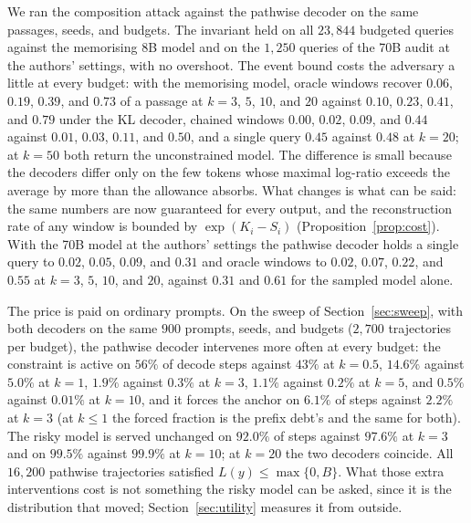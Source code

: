 We ran the composition attack against the pathwise decoder on the same passages, seeds, and budgets. The invariant held on all $23{,}844$ budgeted queries against the memorising 8B model and on the $1{,}250$ queries of the 70B audit at the authors' settings, with no overshoot. The event bound costs the adversary a little at every budget: with the memorising model, oracle windows recover $0.06$, $0.19$, $0.39$, and $0.73$ of a passage at $k = 3$, $5$, $10$, and $20$ against $0.10$, $0.23$, $0.41$, and $0.79$ under the KL decoder, chained windows $0.00$, $0.02$, $0.09$, and $0.44$ against $0.01$, $0.03$, $0.11$, and $0.50$, and a single query $0.45$ against $0.48$ at $k=20$; at $k=50$ both return the unconstrained model. The difference is small because the decoders differ only on the few tokens whose maximal log-ratio exceeds the average by more than the allowance absorbs. What changes is what can be said: the same numbers are now guaranteed for every output, and the reconstruction rate of any window is bounded by $\exp(K_i - S_i)$ (Proposition~\ref{prop:cost}). With the 70B model at the authors' settings the pathwise decoder holds a single query to $0.02$, $0.05$, $0.09$, and $0.31$ and oracle windows to $0.02$, $0.07$, $0.22$, and $0.55$ at $k = 3$, $5$, $10$, and $20$, against $0.31$ and $0.61$ for the sampled model alone.

The price is paid on ordinary prompts. On the sweep of Section~\ref{sec:sweep}, with both decoders on the same $900$ prompts, seeds, and budgets ($2{,}700$ trajectories per budget), the pathwise decoder intervenes more often at every budget: the constraint is active on $56\%$ of decode steps against $43\%$ at $k=0.5$, $14.6\%$ against $5.0\%$ at $k=1$, $1.9\%$ against $0.3\%$ at $k=3$, $1.1\%$ against $0.2\%$ at $k=5$, and $0.5\%$ against $0.01\%$ at $k=10$, and it forces the anchor on $6.1\%$ of steps against $2.2\%$ at $k=3$ (at $k \le 1$ the forced fraction is the prefix debt's and the same for both). The risky model is served unchanged on $92.0\%$ of steps against $97.6\%$ at $k=3$ and on $99.5\%$ against $99.9\%$ at $k=10$; at $k=20$ the two decoders coincide. All $16{,}200$ pathwise trajectories satisfied $L(y) \le \max\{0, B\}$. What those extra interventions cost is not something the risky model can be asked, since it is the distribution that moved; Section~\ref{sec:utility} measures it from outside.

